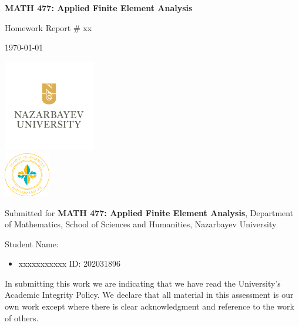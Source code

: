 \documentclass[12pt, a4paper]{article}
\begin{document}
\begin{titlepage}
    \centering

    \vspace*{0.5cm}
    {\Large\bfseries MATH 477: Applied Finite Element Analysis\par}

    \vspace{1cm}
    {\large Homework Report \# xx\par}

    \vspace{0.5cm}
    {\today\par}

    \vspace{1pt}
    \includegraphics[width=0.3\textwidth]{NU-logo.png}\\
    \includegraphics[width=0.15\textwidth]{sosah-logo.png}

    \vspace{0.5cm}
    Submitted for {\bf MATH 477: Applied Finite Element Analysis}, Department of Mathematics, School of Sciences and Humanities, Nazarbayev University

    \vspace{0.5cm}
    {\large Student Name:\par}
    \begin{itemize}[leftmargin=5cm,rightmargin=4cm]
        \item  xxxxxxxxxxx  ID: 202031896
    \end{itemize}

    \vspace{0.5cm}

    \vspace{0.5cm}
    {\footnotesize In submitting this work we are indicating
    that we have read the University's Academic Integrity Policy. We
    declare that all material in this assessment is our own work except
    where there is clear acknowledgment and reference to the work of
    others.\par}
\end{titlepage}
\end{document}
